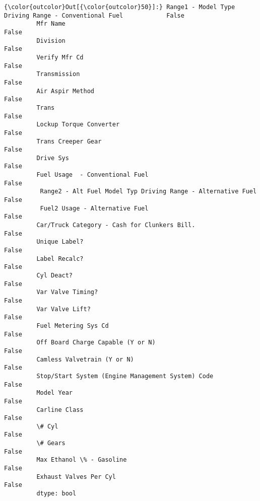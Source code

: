 \documentclass[11pt]{article}
\begin{document}
            \begin{Verbatim}[commandchars=\\\{\}]
{\color{outcolor}Out[{\color{outcolor}50}]:} Range1 - Model Type Driving Range - Conventional Fuel            False
         Mfr Name                                                         False
         Division                                                         False
         Verify Mfr Cd                                                    False
         Transmission                                                     False
         Air Aspir Method                                                 False
         Trans                                                            False
         Lockup Torque Converter                                          False
         Trans Creeper Gear                                               False
         Drive Sys                                                        False
         Fuel Usage  - Conventional Fuel                                  False
          Range2 - Alt Fuel Model Typ Driving Range - Alternative Fuel    False
          Fuel2 Usage - Alternative Fuel                                  False
         Car/Truck Category - Cash for Clunkers Bill.                     False
         Unique Label?                                                    False
         Label Recalc?                                                    False
         Cyl Deact?                                                       False
         Var Valve Timing?                                                False
         Var Valve Lift?                                                  False
         Fuel Metering Sys Cd                                             False
         Off Board Charge Capable (Y or N)                                False
         Camless Valvetrain (Y or N)                                      False
         Stop/Start System (Engine Management System) Code                False
         Model Year                                                       False
         Carline Class                                                    False
         \# Cyl                                                            False
         \# Gears                                                          False
         Max Ethanol \% - Gasoline                                         False
         Exhaust Valves Per Cyl                                           False
         dtype: bool
\end{Verbatim}
        
\end{document}
